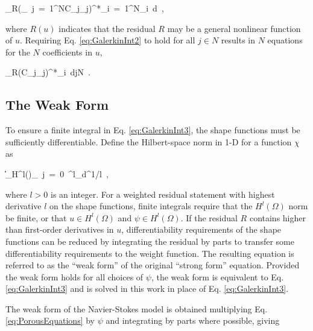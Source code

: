\beq
\label{eq:GalerkinInt2}
\bigintsss_{\Omega}\left\lbrack R\left(\sum_{\ j\ =\ 1}^NC_j\phi_j\right)\right\rbrack^*\sum_{i\ =\ 1}^N\phi_i\ d\ ,
\eeq

\noindent where \(R(u)\) indicates that the residual \(R\) may be a general nonlinear function of \(u\). Requiring Eq. \eqref{eq:GalerkinInt2} to hold for all \(j\in N\) results in \(N\) equations for the \(N\) coefficients in \(u\),

\beq
\label{eq:GalerkinInt3}
\int_{\Omega}\left\lbrack R\left(C_j\phi_j\right)\right\rbrack^*\phi_i\ d\hspace{1cm}j\in N\ .
\eeq

\subsection{The Weak Form}
\label{sec:weak_form}

To ensure a finite integral in Eq. \eqref{eq:GalerkinInt3}, the shape functions must be sufficiently differentiable. Define the Hilbert-space norm in 1-D for a function \(\chi\) as

\beq
\label{eq:HilbertNorm}
\|\chi\|_{H^l(\Omega)}\equiv\left\lbrack\sum_{\ j\ =\ 0\ }^{l}\int_{\Omega}d\Omega\right\rbrack^{1/l}\ ,
\eeq

\noindent where \(l>0\) is an integer. For a weighted residual statement with highest derivative \(l\) on the shape functions, finite integrals require that the \(H^l(\Omega)\) norm be finite, or that \(u\in H^l(\Omega)\) and \(\psi\in H^l(\Omega)\). If the residual \(R\) contains higher than first-order derivatives in \(u\), differentiability requirements of the shape functions can be reduced by integrating the residual by parts to transfer some differentiability requirements to the weight function. The resulting equation is referred to as the ``weak form'' of the original ``strong form'' equation. Provided the weak form holds for all choices of \(\psi\), the weak form is equivalent to Eq. \eqref{eq:GalerkinInt3} and is solved in this work in place of Eq. \eqref{eq:GalerkinInt3}.

The weak form of the Navier-Stokes model is obtained multiplying Eq. \eqref{eq:PorousEquations} by \(\psi\) and integrating by parts where possible, giving

